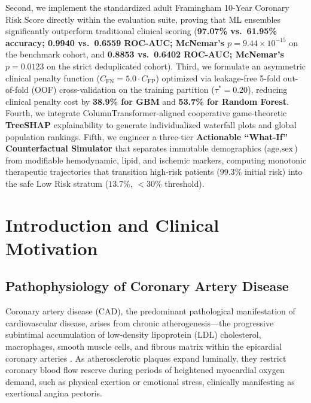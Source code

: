 \documentclass[12pt,a4paper]{report}
\begin{document}
Second, we implement the standardized adult Framingham 10-Year Coronary Risk Score directly within the evaluation suite, proving that ML ensembles significantly outperform traditional clinical scoring (\textbf{97.07\% vs.\ 61.95\% accuracy; 0.9940 vs.\ 0.6559 ROC-AUC; McNemar's $p = 9.44 \times 10^{-15}$} on the benchmark cohort, and \textbf{0.8853 vs.\ 0.6402 ROC-AUC; McNemar's $p = 0.0123$} on the strict deduplicated cohort). Third, we formulate an asymmetric clinical penalty function ($C_{\text{FN}} = 5.0 \cdot C_{\text{FP}}$) optimized via leakage-free 5-fold out-of-fold (OOF) cross-validation on the training partition ($\tau^* = 0.20$), reducing clinical penalty cost by \textbf{38.9\% for GBM} and \textbf{53.7\% for Random Forest}. Fourth, we integrate ColumnTransformer-aligned cooperative game-theoretic \textbf{TreeSHAP} explainability to generate individualized waterfall plots and global population rankings. Fifth, we engineer a three-tier \textbf{Actionable ``What-If'' Counterfactual Simulator} that separates immutable demographics ($\text{age}, \text{sex}$) from modifiable hemodynamic, lipid, and ischemic markers, computing monotonic therapeutic trajectories that transition high-risk patients ($99.3\%$ initial risk) into the safe Low Risk stratum ($13.7\%$, $<30\%$ threshold).

\newpage
{}
\tableofcontents
\newpage
{}
\listoffigures
\newpage
{}
\listoftables
\newpage


\chapter[Introduction \& Clinical Motivation]{Introduction and Clinical Motivation}

\section{Pathophysiology of Coronary Artery Disease}
Coronary artery disease (CAD), the predominant pathological manifestation of cardiovascular disease, arises from chronic atherogenesis---the progressive subintimal accumulation of low-density lipoprotein (LDL) cholesterol, macrophages, smooth muscle cells, and fibrous matrix within the epicardial coronary arteries \cite{who2021cvd,detrano1989international}. As atherosclerotic plaques expand luminally, they restrict coronary blood flow reserve during periods of heightened myocardial oxygen demand, such as physical exertion or emotional stress, clinically manifesting as exertional angina pectoris.
\end{document}
